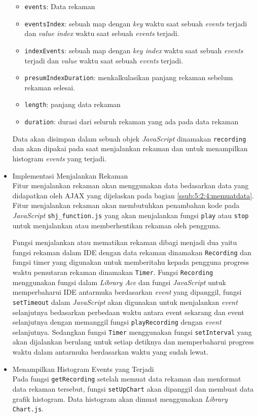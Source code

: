 \begin{itemize}
    \begin{itemize}
        \item \verb|events|: Data rekaman
        \item \verb|eventsIndex|: sebuah map dengan \textit{key} waktu saat sebuah \textit{events} terjadi dan \textit{value index} waktu saat sebuah \textit{events} terjadi.
        \item \verb|indexEvents|: sebuah map dengan \textit{key index} waktu saat sebuah \textit{events} terjadi dan \textit{value} waktu saat sebuah \textit{events} terjadi.
        \item \verb|presumIndexDuration|: menkalkulasikan panjang rekaman sebelum rekaman selesai.
        \item \verb|length|: panjang data rekaman
        \item \verb|duration|: durasi dari seluruh rekaman yang ada pada data rekaman
    \end{itemize}

    Data akan disimpan dalam sebuah objek \textit{JavaScript} dinamakan \verb|recording| dan akan dipakai pada saat menjalankan rekaman dan untuk menampilkan histogram \textit{events} yang terjadi.

    \item Implementasi Menjalankan Rekaman \\
    Fitur menjalankan rekaman akan menggunakan data bedasarkan data yang didapatkan oleh AJAX yang dijelaskan pada bagian \ref{ssub:5:2:4:memuatdata}. Fitur menjalankan rekaman akan membutuhkan penambahan kode pada \textit{JavaScript} \verb|shj_function.js| yang akan menjalankan fungsi \verb|play| atau \verb|stop| untuk menjalankan atau memberhentikan rekaman oleh pengguna. 

    Fungsi menjalankan atau mematikan rekaman dibagi menjadi dua yaitu fungsi rekaman dalam IDE dengan data rekaman dinamakan \verb|Recording| dan fungsi timer yang digunakan untuk memberitahu kepada pengguna progress waktu pemutaran rekaman dinamakan \verb|Timer|.
    Fungsi \verb|Recording| menggunakan fungsi dalam \textit{Library Ace} dan fungsi \textit{JavaScript} untuk memperbaharui IDE antarmuka berdasarkan \textit{event} yang dipanggil, fungsi \verb|setTimeout| dalam \textit{JavaScript} akan digunakan untuk menjalankan \textit{event} selanjutnya bedasarkan perbedaan waktu antara event sekarang dan event selanjutnya dengan memanggil fungsi \verb|playRecording| dengan \textit{event} selanjutnya. Sedangkan fungsi \verb|Timer| menggunakan fungsi \verb|setInterval| yang akan dijalankan berulang untuk setiap detiknya dan memperbaharui progress waktu dalam antarmuka berdasarkan waktu yang sudah lewat.

    \item Menampilkan Histogram Events yang Terjadi \\
    Pada fungsi \verb|getRecording| setelah memuat data rekaman dan menformat data rekaman tersebut, fungsi \verb|setUpChart| akan dipanggil dan membuat data grafik histogram. Data histogram akan dimuat menggunakan \textit{Library} \verb|Chart.js|.

\end{itemize}

